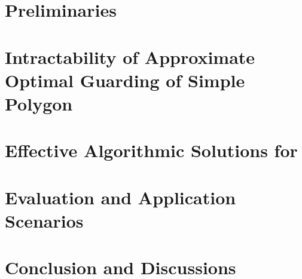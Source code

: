 \section{Preliminaries}\label{sec:osg-problem}


\section{Intractability of Approximate Optimal Guarding of Simple Polygon}\label{sec:osg-complexity}


\section{Effective Algorithmic Solutions for \osgt}\label{sec:osg-algo}


\section{Evaluation and Application Scenarios}\label{sec:osg-expr}


\section{Conclusion and Discussions}\label{sec:osg-conc}


